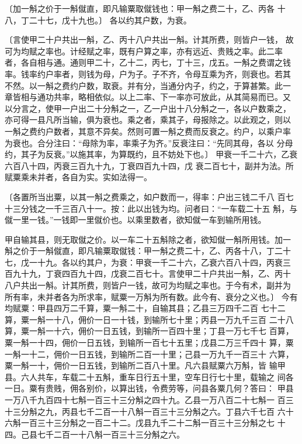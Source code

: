 \documentclass[12pt,UTF8]{ctexbook}
\begin{document}
〔加一斛之价于一斛僦直，即凡输粟取僦钱也：甲一斛之费二十，乙、丙各 十八，丁二十七，戊十九也。〕 各以约其户数，为衰。

〔言使甲二十户共出一斛，乙、丙十八户共出一斛。计其所费，则皆户一钱， 故可为均赋之率也。计经赋之率，既有户算之率，亦有远近、贵贱之率。此二率 者，各自相与通。通则甲二十，乙十二，丙七，丁十三，戊五。一斛之费谓之钱 率。钱率约户率者，则钱为母，户为子。子不齐，令母互乘为齐，则衰也。若其 不然。以一斛之费约户数，取衰。并有分，当通分内子，约之，于算甚繁。此一 章皆相与通功共率，略相依似。以上二率、下一率亦可放此，从其简易而已。又 以分言之，使甲一户出二十分斛之一，乙一户出十八分斛之一，各以户数乘之， 亦可得一县凡所当输，俱为衰也。乘之者，乘其子，母报除之。以此观之，则以 一斛之费约户数者，其意不异矣。然则可置一斛之费而反衰之。约户，以乘户率 为衰也。合分注曰：“母除为率，率乘子为齐。”反衰注曰：“先同其母，各以 分母约，其子为反衰。”以施其率，为算既约，且不妨处下也。〕 甲衰一千二十六，乙衰六百八十四，丙衰三百九十九，丁衰四百九十四，戊 衰二百七十，副并为法。所赋粟乘未并者，各自为实。实如法得一。

〔各置所当出粟，以其一斛之费乘之，如户数而一，得率：户出三钱二千八 百七十三分钱之一千三百八十一。按：此以出钱为均。问者曰：“一车载二十五 斛，与僦一里一钱。”一钱即一里僦价也。以乘里数者，欲知僦一车到输所用钱。

甲自输其县，则无取僦之价。以一车二十五斛除之者，欲知僦一斛所用钱。加一 斛之价于一斛僦直，即凡输粟取僦钱：甲一斛之费二十，乙、丙各十八，丁二十 七，戊一十九。各以约其户，为衰：甲衰一千二十六，乙衰六百八十四，丙衰三 百九十九，丁衰四百九十四，戊衰二百七十。言使甲二十户共出一斛，乙、丙十 八户共出一斛。计其所费，则皆户一钱，故可为均赋之率也。于今有术，副并为 所有率，未并者各为所求率，赋粟一万斛为所有数。此今有、衰分之义也。〕 今有均赋粟：甲县四万二千算，粟一斛二十，自输其县；乙县三万四千二百 七十二算，粟一斛一十八，佣价一日一十钱，到输所七十里；丙县一万九千三百 二十八算，粟一斛一十六，佣价一日五钱，到输所一百四十里；丁县一万七千七 百算，粟一斛一十四，佣价一日五钱，到输所一百七十五里；戊县二万三千四十 算，粟一斛一十二，佣价一日五钱，到输所二百一十里；己县一万九千一百三十 六算，粟一斛一十，佣价一日五钱，到输所二百八十里。凡六县赋粟六万斛，皆 输甲县。六人共车，车载二十五斛，重车日行五十里，空车日行七十里，载输之 间各一日。粟有贵贱，佣各别价，以算出钱，令费劳等，问县各粟几何？答曰： 甲县一万八千九百四十七斛一百三十三分斛之四十九。乙县一万八百二十七斛一 百三十三分斛之九，丙县七千二百一十八斛一百三十三分斛之六。丁县六千七百 六十六斛一百三十三分斛之一百二十二。戊县九千二十二斛一百三十三分斛之七 十四。己县七千二百一十八斛一百三十三分斛之六。
\end{document}
